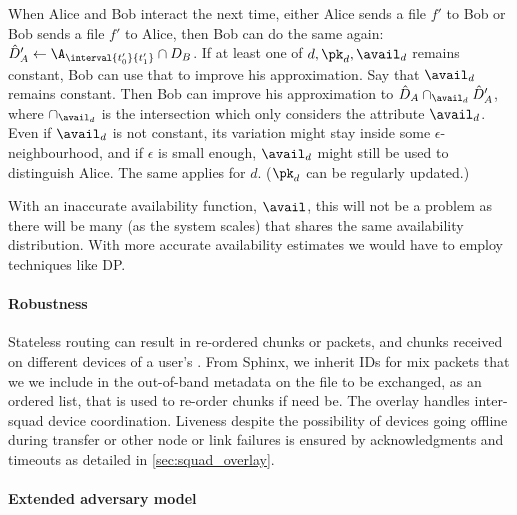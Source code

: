 When Alice and Bob interact the next time, either Alice sends a file \(f'\) to 
Bob or Bob sends a file \(f'\) to Alice, then Bob can do the same again:
\(\hat D_A' \gets \A_{\interval{t_0'}{t_1'}} \cap D_B\).
If at least one of \(d, \pk_d, \avail_d\) remains constant, Bob can use that to 
improve his approximation.
Say that \(\avail_d\) remains constant.
Then Bob can improve his approximation to \(\hat D_A \cap_{\avail_d} 
  \hat{D}_A'\), where \(\cap_{\avail_d}\) is the intersection which only 
considers the attribute \(\avail_d\).
Even if \(\avail_d\) is not constant, its variation might stay inside some 
\(\epsilon\)-neighbourhood, and if \(\epsilon\) is small enough, \(\avail_d\) 
might still be used to distinguish Alice.
The same applies for \(d\).
(\(\pk_d\) can be regularly updated.)

With an inaccurate availability function, \(\avail\), this will not be a 
problem as there will be many (as the system scales) that shares the same 
availability distribution.
With more accurate availability estimates we would have to employ techniques 
like \ac{DP}.

\paragraph*{Robustness}

Stateless routing can result in re-ordered chunks or packets, and
chunks received on different devices of a user's \squad. From Sphinx,
we inherit IDs for mix packets that we we include in the out-of-band
metadata on the file to be exchanged, as an ordered list, that is used
to re-order chunks if need be. The \squad overlay handles inter-squad
device coordination. Liveness despite the possibility of \squad devices
going offline during transfer or other node or link failures is
ensured by acknowledgments and timeouts as detailed in 
\cref{sec:squad_overlay}.


\paragraph*{Extended adversary model}%
\label{security-limitations}

